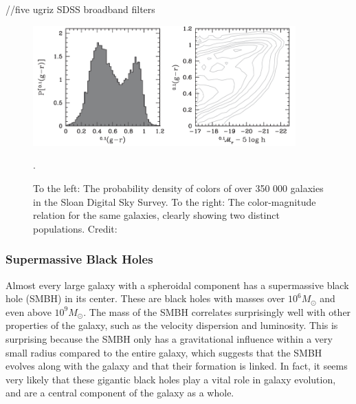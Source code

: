 //five ugriz SDSS broadband filters

\begin{figure}
    \centering
    \includegraphics[width=0.9\textwidth]{images/color_bimodality.png}
    \caption{To the left: The probability density of colors of over 350 000 galaxies in the Sloan Digital Sky Survey. To the right: The color-magnitude relation for the same galaxies, clearly showing two distinct populations. Credit: \cite{Mo2010}}.
    \label{color_bimodality}
\end{figure}

\subsubsection{Supermassive Black Holes}
Almost every large galaxy with a spheroidal component has a supermassive black hole (SMBH) in its center. These are black holes with masses over $10^6 M_{\odot}$ and even above $10^9 M_{\odot}$. The mass of the SMBH correlates surprisingly well with other properties of the galaxy, such as the velocity dispersion and luminosity. This is surprising because the SMBH only has a gravitational influence within a very small radius compared to the entire galaxy, which suggests that the SMBH evolves along with the galaxy and that their formation is linked. In fact, it seems very likely that these gigantic black holes play a vital role in galaxy evolution, and are a central component of the galaxy as a whole.